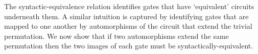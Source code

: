 \documentclass[../paper.tex]{subfiles}
\begin{document}
The syntactic-equivalence relation identifies gates that have `equivalent'
circuits underneath them. A similar intuition is captured by identifying gates
that are mapped to one another by automorphisms of the circuit that extend the
trivial permutation. We now show that if two automorphisms extend the same
permutation then the two images of each gate must be syntactically-equivalent.



\end{document}
